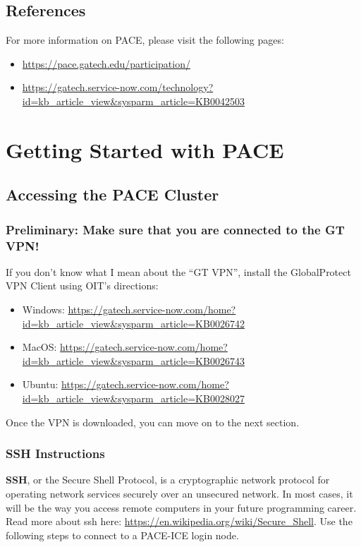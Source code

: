 \documentclass{article}
\begin{document}
\subsection{References}

For more information on PACE, please visit the following pages:
\begin{itemize}
    \item \url{https://pace.gatech.edu/participation/}
    \item \url{https://gatech.service-now.com/technology?id=kb_article_view&sysparm_article=KB0042503}
\end{itemize}

\section{Getting Started with PACE}

\subsection{Accessing the PACE Cluster}

\subsubsection{Preliminary: Make sure that you are connected to the GT VPN!}

If you don't know what I mean about the ``GT VPN'', install the GlobalProtect VPN Client using OIT's directions:
\begin{itemize}
    \item Windows: \url{https://gatech.service-now.com/home?id=kb_article_view&sysparm_article=KB0026742}
    \item MacOS: \url{https://gatech.service-now.com/home?id=kb_article_view&sysparm_article=KB0026743}
    \item Ubuntu: \url{https://gatech.service-now.com/home?id=kb_article_view&sysparm_article=KB0028027}
\end{itemize}

Once the VPN is downloaded, you can move on to the next section.

\subsubsection{SSH Instructions}

\textbf{SSH}, or the Secure Shell Protocol, is a cryptographic network protocol for operating network services securely over an unsecured network. In most cases, it will be the way you access remote computers in your future programming career. Read more about ssh here: \url{https://en.wikipedia.org/wiki/Secure_Shell}. Use the following steps to connect to a PACE-ICE login node.
\end{document}
